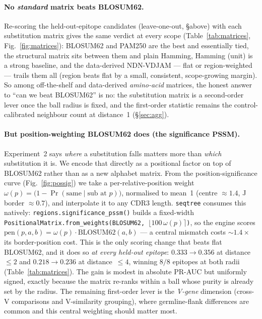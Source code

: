 \documentclass[11pt]{article}
\theoremstyle{oldplain}
\theoremstyle{oldrem}
\begin{document}
\paragraph{No \emph{standard} matrix beats BLOSUM62.} Re-scoring the held-out-epitope candidates
(leave-one-out, \S above) with each substitution matrix gives the same verdict at every scope
(Table~\ref{tab:matrices}, Fig.~\ref{fig:matrices}): BLOSUM62 and PAM250 are the best and essentially
tied, the structural matrix sits between them and plain Hamming, Hamming (unit) is a strong baseline,
and the data-derived NDN-VDJAM --- flat or region-weighted --- trails them all (region beats flat by a
small, consistent, scope-growing margin). So among off-the-shelf and data-derived \emph{amino-acid}
matrices, the honest answer to ``can we beat BLOSUM62'' is no: the substitution matrix is a
second-order lever once the ball radius is fixed, and the first-order statistic remains the
control-calibrated neighbour count at distance~1 (\S\ref{sec:agg}).

\paragraph{But position-weighting BLOSUM62 does (the significance PSSM).}\label{sec:possig}
Experiment~2 says \emph{where} a substitution falls matters more than \emph{which} substitution it is.
We encode that directly as a positional factor on top of BLOSUM62 rather than as a new alphabet matrix.
From the position-significance curve (Fig.~\ref{fig:possig}) we take a per-relative-position weight
$\omega(p)=\bigl(1-\Pr(\text{same}\mid\text{sub at }p)\bigr)$, normalised to mean~1 (centre
$\approx1.4$, J border $\approx0.7$), and interpolate it to any CDR3 length. \texttt{seqtree} consumes
this natively: \texttt{regions.significance\_pssm()} builds a fixed-width
\texttt{PositionalMatrix.from\_weights(BLOSUM62, $\lfloor100\,\omega(p)\rceil$)}, so the engine scores
$\mathrm{pen}(p,a,b)=\omega(p)\cdot\mathrm{BLOSUM62}(a,b)$ --- a central mismatch costs $\sim1.4\times$
its border-position cost. This is the only scoring change that beats flat BLOSUM62, and it does so
\emph{at every held-out epitope}: $0.333\!\to\!0.356$ at distance~$\le2$ and $0.218\!\to\!0.236$ at
distance~$\le4$, winning $8/8$ epitopes at both radii (Table~\ref{tab:matrices}). The gain is modest in
absolute PR-AUC but uniformly signed, exactly because the matrix re-ranks within a ball whose purity is
already set by the radius. The remaining first-order lever is the \emph{V-gene} dimension (cross-V
comparisons and V-similarity grouping), where germline-flank differences are common and this central
weighting should matter most.
\end{document}

